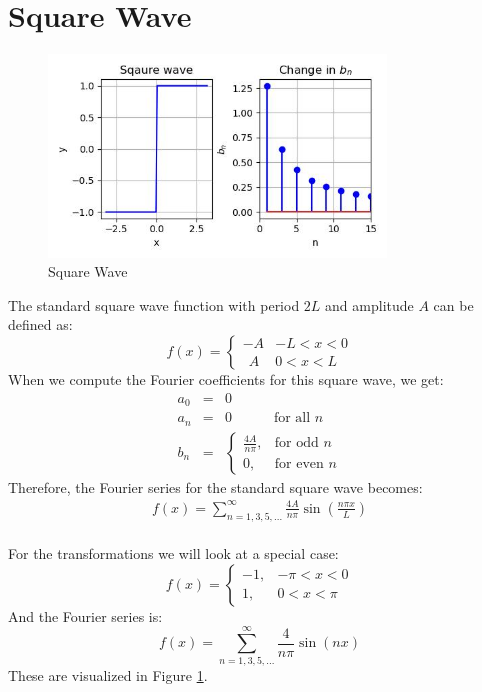 \documentclass{article}
\begin{document}
\section{Square Wave}
\begin{figure}
    \centering
    \includegraphics[width=0.8\textwidth]{sqaurewave.jpg}
    \caption{Square Wave}
    \label{fig: Square Wave}
\end{figure}
The standard square wave function with period $2L$ and amplitude $A$ can be defined as:
\begin{equation}
    f(x) = 
\begin{cases} 
-A&     -L < x < 0 \\
~~A&      0 < x < L
\end{cases}
    \end{equation}
When we compute the Fourier coefficients for this square wave, we get:
\begin{eqnarray}
a_0 &=& 0 \nonumber\\
a_n &=& 0 \quad\quad\quad \text{for all } n\\
b_n &=& 
\begin{cases} 
\frac{4A}{n\pi}, & \text{for odd } n \\
0, & \text{for even } n\nonumber
\end{cases}
\end{eqnarray}
Therefore, the Fourier series for the standard square wave becomes: 
\begin{eqnarray}
    f(x) =  \sum_{n=1,3,5,...}^{\infty} \frac{4A}{n\pi} \sin\left(\frac{n\pi x}{L}\right)
\end{eqnarray}\\
For the transformations we will look at a special case:
\begin{equation}
f(x) = 
\begin{cases} 
-1, & -\pi < x < 0 \\
1, & 0 < x < \pi
\end{cases}
\end{equation}
And the Fourier series is:
$$f(x) =  \sum_{n=1,3,5,...}^{\infty} \frac{4}{n\pi} \sin\left(n x\right)$$
These are visualized  in Figure \ref{fig: Square Wave}.
\end{document}
